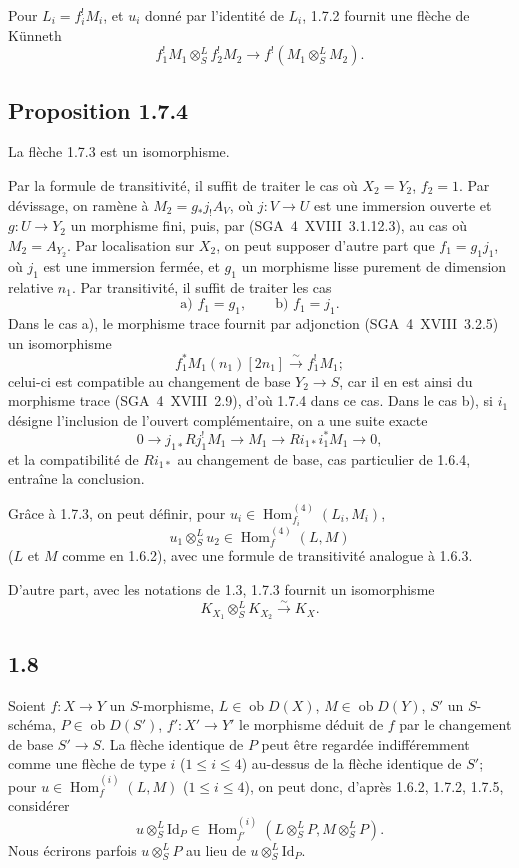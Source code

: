 \documentclass[11pt]{article}
\DeclareMathOperator{\Hom}{Hom}
\newcommand{\ob}{\operatorname{ob}}
\providecommand{\Id}{\mathrm{Id}}
\providecommand{\Hom}{\operatorname{Hom}}
\providecommand{\ob}{\operatorname{ob}}
\providecommand{\Hom}{\operatorname{Hom}}
\begin{document}
Pour $L_i=f_i^{!}M_i$, et $u_i$ donné par l'identité de $L_i$, 1.7.2 fournit une flèche de Künneth
\begin{equation}\tag{1.7.3}
f_1^{!}M_1\otimes^{L}_{S}f_2^{!}M_2\longrightarrow f^{!}(M_1\otimes^{L}_{S}M_2).
\end{equation}

\subsection*{Proposition 1.7.4}
La flèche 1.7.3 est un isomorphisme.

Par la formule de transitivité, il suffit de traiter le cas où $X_2=Y_2$, $f_2=1$. Par dévissage, on ramène à $M_2=g_{*}j_{!}A_V$, où $j:V\to U$ est une immersion ouverte et $g:U\to Y_2$ un morphisme fini, puis, par (SGA~4~XVIII~3.1.12.3), au cas où $M_2=A_{Y_2}$. Par localisation sur $X_2$, on peut supposer d'autre part que $f_1=g_1j_1$, où $j_1$ est une immersion fermée, et $g_1$ un morphisme lisse purement de dimension relative $n_1$. Par transitivité, il suffit de traiter les cas
\[
\text{a) } f_1=g_1,\qquad \text{b) } f_1=j_1.
\]
Dans le cas a), le morphisme trace fournit par adjonction (SGA~4~XVIII~3.2.5) un isomorphisme
\[
f_1^{*}M_1(n_1)[2n_1]\xrightarrow{\sim}f_1^{!}M_1;
\]
celui-ci est compatible au changement de base $Y_2\to S$, car il en est ainsi du morphisme trace (SGA~4~XVIII~2.9), d'où 1.7.4 dans ce cas. Dans le cas b), si $i_1$ désigne l'inclusion de l'ouvert complémentaire, on a une suite exacte
\[
0\longrightarrow j_{1*}Rj_1^{!}M_1\longrightarrow M_1\longrightarrow Ri_{1*}i_1^{*}M_1\longrightarrow0,
\]
et la compatibilité de $Ri_{1*}$ au changement de base, cas particulier de 1.6.4, entraîne la conclusion.

Grâce à 1.7.3, on peut définir, pour $u_i\in\Hom_{f_i}^{(4)}(L_i,M_i)$,
\begin{equation}\tag{1.7.5}
u_1\otimes^{L}_{S}u_2\in\Hom_f^{(4)}(L,M)
\end{equation}
($L$ et $M$ comme en 1.6.2), avec une formule de transitivité analogue à 1.6.3.

D'autre part, avec les notations de 1.3, 1.7.3 fournit un isomorphisme
\begin{equation}\tag{1.7.6}
K_{X_1}\otimes^{L}_{S}K_{X_2}\xrightarrow{\sim}K_X.
\end{equation}

\subsection*{1.8}
Soient $f:X\to Y$ un $S$-morphisme, $L\in\ob D(X)$, $M\in\ob D(Y)$, $S'$ un $S$-schéma, $P\in\ob D(S')$, $f':X'\to Y'$ le morphisme déduit de $f$ par le changement de base $S'\to S$. La flèche identique de $P$ peut être regardée indifféremment comme une flèche de type $i$ ($1\leq i\leq4$) au-dessus de la flèche identique de $S'$; pour $u\in\Hom_f^{(i)}(L,M)$ ($1\leq i\leq4$), on peut donc, d'après 1.6.2, 1.7.2, 1.7.5, considérer
\begin{equation}\tag{1.8.1}
u\otimes^{L}_{S}\Id_P\in\Hom_{f'}^{(i)}(L\otimes^{L}_{S}P,M\otimes^{L}_{S}P).
\end{equation}
Nous écrirons parfois $u\otimes^{L}_{S}P$ au lieu de $u\otimes^{L}_{S}\Id_P$.
\end{document}
